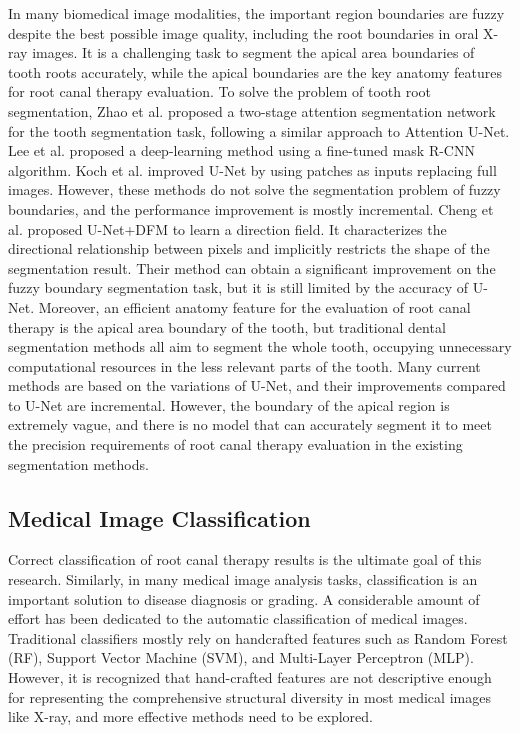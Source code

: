 \documentclass[journal]{IEEEtran}
\begin{document}
In many biomedical image modalities, the important region boundaries are fuzzy despite the best possible image quality, including the root boundaries in oral X-ray images. It is a challenging task to segment the apical area boundaries of tooth roots accurately, while the apical boundaries are the key anatomy features for root canal therapy evaluation.
To solve the problem of tooth root segmentation, Zhao et al.\cite{zhao2020tsasnet} proposed a two-stage attention segmentation network for the tooth segmentation task, following a similar approach to Attention U-Net\cite{oktay2018attention}. Lee et al.\cite{lee2020application} proposed a deep-learning method using a fine-tuned mask R-CNN\cite{he2017mask} algorithm. Koch et al.\cite{koch2019accurate} improved U-Net by using patches as inputs replacing full images. However, these methods do not solve the segmentation problem of fuzzy boundaries, and the performance improvement is mostly incremental. Cheng et al.\cite{cheng2020learning} proposed U-Net+DFM to learn a direction field. It characterizes the directional relationship between pixels and implicitly restricts the shape of the segmentation result. Their method can obtain a significant improvement on the fuzzy boundary segmentation task, but it is still limited by the accuracy of U-Net\cite{ronneberger2015u}. Moreover, an efficient anatomy feature for the evaluation of root canal therapy is the apical area boundary of the tooth, but traditional dental segmentation methods all aim to segment the whole tooth, occupying unnecessary computational resources in the less relevant parts of the tooth. Many current methods are based on the variations of U-Net, and their improvements compared to U-Net are incremental. However, the boundary of the apical region is extremely vague, and there is no model that can accurately segment it to meet the precision requirements of root canal therapy evaluation in the existing segmentation methods.

\subsection{Medical Image Classification}
Correct classification of root canal therapy results is the ultimate goal of this research. Similarly, in many medical image analysis tasks, classification is an important solution to disease diagnosis or grading. A considerable amount of effort has been dedicated to the automatic classification of medical images. Traditional classifiers mostly rely on handcrafted features such as Random Forest (RF)\cite{gray2013random}, Support Vector Machine (SVM)\cite{noble2006support}, and Multi-Layer Perceptron (MLP)\cite{tang2015extreme}. However, it is recognized that hand-crafted features are not descriptive enough for representing the comprehensive structural diversity in most medical images like X-ray, and more effective methods need to be explored.
\end{document}
